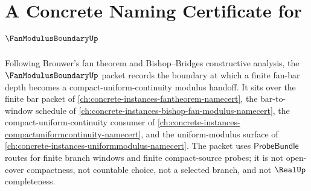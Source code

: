 \chapter{A Concrete Naming Certificate for $\FanModulusBoundaryUp$}
\label{ch:concrete-instances-fan-modulus-boundary-namecert}

Following Brouwer's fan theorem and Bishop--Bridges constructive analysis, the $\FanModulusBoundaryUp$ packet records the boundary at which a finite fan-bar depth becomes a compact-uniform-continuity modulus handoff. It sits over the finite bar packet of \autoref{ch:concrete-instances-fantheorem-namecert}, the bar-to-window schedule of \autoref{ch:concrete-instances-bishop-fan-modulus-namecert}, the compact-uniform-continuity consumer of \autoref{ch:concrete-instances-compactuniformcontinuity-namecert}, and the uniform-modulus surface of \autoref{ch:concrete-instances-uniformmodulus-namecert}. The packet uses $\mathsf{ProbeBundle}$ routes for finite branch windows and finite compact-source probes; it is not open-cover compactness, not countable choice, not a selected branch, and not $\RealUp$ completeness.

